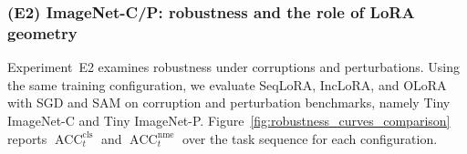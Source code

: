 \documentclass[10pt]{article} %
\begin{document}














\subsubsection{(E2) ImageNet-C/P: robustness and the role of LoRA geometry}

Experiment~E2 examines robustness under corruptions and perturbations. Using the same training configuration, we evaluate SeqLoRA, IncLoRA, and OLoRA with SGD and SAM on corruption and perturbation benchmarks, namely Tiny ImageNet-C and Tiny ImageNet-P. Figure~\ref{fig:robustness_curves_comparison} reports $\operatorname{ACC}_t^{\mathrm{cls}}$ and $\operatorname{ACC}_t^{\mathrm{nme}}$ over the task sequence for each configuration.




    
\end{document}
